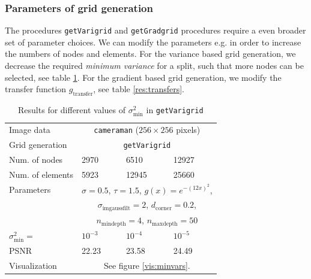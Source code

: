 \documentclass{report}
\begin{document}
\subsubsection{Parameters of grid generation}

The procedures \texttt{getVarigrid} and \texttt{getGradgrid} procedures require a even broader set of parameter choices. We can modify the parameters e.g. in order to increase the numbers of nodes and elements. For the variance based grid generation, we decrease the required \textit{minimum variance} for a split, such that more nodes can be selected, see table \ref{res:minvars}. For the gradient based grid generation, we modify the transfer function $g_\text{transfer}$, see table \ref{res:transfers}. 

\begin{table}[h]
	\centering
	\begin{tabular}{|llll}
		Image data & \multicolumn{3}{c}{\texttt{cameraman} ($256 \times 256$ pixels)} \\
		Grid generation & \multicolumn{3}{c}{\texttt{getVarigrid}} \\
		Num. of nodes & 2970 & 6510 & 12927 \\
		Num. of elements & 5923 & 12945 & 25660 \\
		Parameters & \multicolumn{3}{c}{$\sigma=0.5$, $\tau=1.5$, $g(x) = e^{-(12 x)^2}$,} \\
		& \multicolumn{3}{c}{$\sigma_\text{imgaussfilt}=2$, $d_\text{corner}=0.2$,} \\
		& \multicolumn{3}{c}{$n_\text{mindepth}=4$, $n_\text{maxdepth}=50$} \\
		$\sigma^2_\text{min}=$ & $10^{-3}$ & $10^{-4}$ & $10^{-5}$ \\
		PSNR & 22.23 & 23.58 & 24.49 \\
		Visualization &  \multicolumn{3}{c}{See figure \ref{vis:minvars}.} \\
	\end{tabular}
	\caption{Results for different values of $\sigma^2_\text{min}$ in \texttt{getVarigrid}}
	\label{res:minvars}
\end{table}
\end{document}
